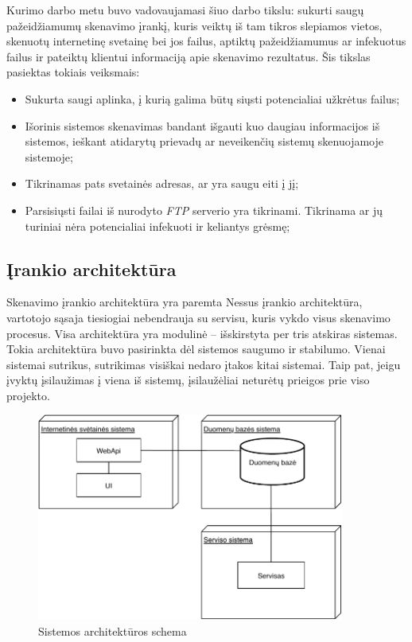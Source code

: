 \documentclass[a4paper,12pt,fleqn]{article}
\begin{document}

Kurimo darbo metu buvo vadovaujamasi šiuo darbo tikslu: sukurti saugų pažeidžiamumų skenavimo įrankį, kuris veiktų iš tam tikros slepiamos vietos, skenuotų internetinę
svetainę bei jos failus, aptiktų pažeidžiamumus ar infekuotus failus ir pateiktų klientui informaciją apie skenavimo rezultatus. Šis tikslas pasiektas tokiais veiksmais:
\begin{itemize}
	\item Sukurta saugi aplinka, į kurią galima būtų siųsti potencialiai užkrėtus failus;
	\item Išorinis sistemos skenavimas bandant išgauti kuo daugiau informacijos iš sistemos, ieškant atidarytų prievadų ar neveikenčių sistemų skenuojamoje sistemoje;
	\item Tikrinamas pats svetainės adresas, ar yra saugu eiti į jį;
	\item Parsisiųsti failai iš nurodyto \textit{FTP} serverio yra tikrinami. Tikrinama ar jų turiniai nėra potencialiai infekuoti ir keliantys grėsmę;
\end{itemize}



\subsection{Įrankio architektūra}

Skenavimo įrankio architektūra yra paremta Nessus įrankio architektūra, vartotojo sąsaja tiesiogiai nebendrauja su servisu, kuris vykdo visus skenavimo procesus. Visa architektūra yra modulinė – išskirstyta per tris atskiras sistemas. Tokia architektūra buvo pasirinkta dėl sistemos saugumo ir stabilumo. Vienai sistemai sutrikus, sutrikimas visiškai nedaro įtakos kitai sistemai. Taip pat, jeigu įvyktų įsilaužimas į viena iš sistemų, įsilaužėliai neturėtų prieigos prie viso projekto.

\begin{figure}[H]
	\centering
	\includegraphics[width=0.9\textwidth]{figs/arch1lt.pdf}
	\caption{Sistemos architektūros schema}
	\label{fig:arch1}
\end{figure}
\end{document}
